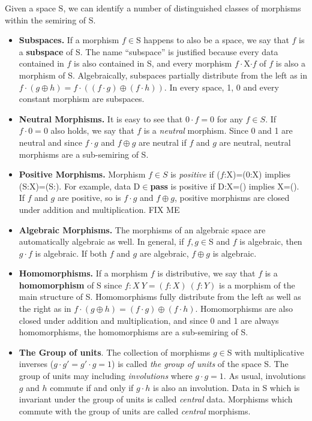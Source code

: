 \documentclass[11pt]{article}
\begin{document}
Given a space S, we can identify a number of distinguished classes of morphisms within the semiring of S. 
\begin{itemize}
\item{{\bf Subspaces.} If a morphism $f\in$S happens to also be a space, we say that $f$ is a {\bf subspace} of S.  The name ``subspace'' is justified because every data contained in $f$ is also contained in S, and every morphism $f\cdot$X$\cdot f$ of $f$ is also a morphism of S.  Algebraically, subspaces partially distribute from the left as 
in $f\cdot(g\oplus h)=f\cdot((f\cdot g)\oplus(f\cdot h))$.  In every space, 1, 0 and every constant morphism are subspaces.}
\item {{\bf Neutral Morphisms.} It is easy to see that $0\cdot f=0$ for any $f\in S$.  If $f\cdot 0=0$ also holds, we say that $f$ is a {\it neutral} morphism.  Since 0 and 1 are neutral and since $f\cdot g$ and $f\oplus g$ are neutral if $f$ and $g$ are neutral, neutral morphisms are a sub-semiring of S.} 
\item {{\bf Positive Morphisms.} Morphism $f\in S$ is {\it positive} if ($f$:X)=(0:X) implies (S:X)=(S:).  For example, data D$\in${\bf pass} is positive if D:X=() implies X=().  If $f$ and $g$ are positive, so is $f\cdot g$ and $f\oplus g$, positive morphisms are closed under addition and multiplication. FIX ME}
\item {{\bf Algebraic Morphisms.} The morphisms of an algebraic space are automatically algebraic as well.  In general, if $f,g\in$S and $f$ is algebraic, then $g\cdot f$ is algebraic.  If both 
$f$ and $g$ are algebraic, $f\oplus g$ is algebraic.}
\item{{\bf Homomorphisms.} If a morphism $f$ is distributive, we say that $f$ is a {\bf homomorphism} of S since $f:X\ Y=(f:X)\ (f:Y)$ is a morphism of the main 
structure of S.  Homomorphisms fully distribute from the left as well as the right as in $f\cdot(g\oplus h)=(f\cdot g)\oplus(f\cdot h)$.  Homomorphisms are also closed under 
addition and multiplication, and since 0 and 1 are always homomorphisms, the homomorphisms are a sub-semiring of S.}
\item {{\bf The Group of units}. The collection of morphisms $g\in$S with multiplicative inverses ($g\cdot g'=g'\cdot g=1$) is called {\it the group of units} of the space S.  The group of units may including {\it involutions} where $g\cdot g=1$.  As usual, involutions $g$ and $h$ commute if and only if $g\cdot h$ is also an involution.  Data in S which is invariant under the group of units is 
called {\it central} data.  Morphisms which commute with the group of units are called {\it central} morphisms.}
\end{itemize} 
\end{document}

